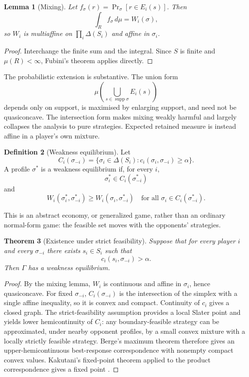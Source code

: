 \documentclass[11pt]{article}
\newtheorem{theorem}{Theorem}
\newtheorem{lemma}[theorem]{Lemma}
\theoremstyle{definition}
\newtheorem{definition}[theorem]{Definition}
\newcommand{\Prob}{\Pr}
\newcommand{\supp}{\operatorname{supp}}
\begin{document}
\begin{lemma}[Mixing]
Let $f_\sigma(r)=\Prob_\sigma[r\in E_i(s)]$. Then
\[
\int_R f_\sigma\,d\mu=W_i(\sigma),
\]
so $W_i$ is multiaffine on $\prod_i\Delta(S_i)$ and affine in $\sigma_i$.
\end{lemma}

\begin{proof}
Interchange the finite sum and the integral. Since $S$ is finite and $\mu(R)<\infty$, Fubini's theorem applies directly.
\end{proof}

The probabilistic extension is substantive. The union form
\[
\mu\!\left(\bigcup_{s\in\supp\sigma}E_i(s)\right)
\]
depends only on support, is maximised by enlarging support, and need not be quasiconcave. The intersection form makes mixing weakly harmful and largely collapses the analysis to pure strategies. Expected retained measure is instead affine in a player's own mixture.

\begin{definition}[Weakness equilibrium]
Let
\[
C_i(\sigma_{-i})=\{\sigma_i\in\Delta(S_i):c_i(\sigma_i,\sigma_{-i})\ge\alpha\}.
\]
A profile $\sigma^*$ is a weakness equilibrium if, for every $i$,
\[
\sigma_i^*\in C_i(\sigma_{-i}^*)
\]
and
\[
W_i(\sigma_i^*,\sigma_{-i}^*)\ge W_i(\sigma_i,\sigma_{-i}^*)
\quad\text{for all }\sigma_i\in C_i(\sigma_{-i}^*).
\]
\end{definition}

This is an abstract economy, or generalized game, rather than an ordinary normal-form game: the feasible set moves with the opponents' strategies.

\begin{theorem}[Existence under strict feasibility]\label{thm:existence}
Suppose that for every player $i$ and every $\sigma_{-i}$ there exists $s_i\in S_i$ such that
\[
c_i(s_i,\sigma_{-i})>\alpha.
\]
Then $\Gamma$ has a weakness equilibrium.
\end{theorem}

\begin{proof}
By the mixing lemma, $W_i$ is continuous and affine in $\sigma_i$, hence quasiconcave. For fixed $\sigma_{-i}$, $C_i(\sigma_{-i})$ is the intersection of the simplex with a single affine inequality, so it is convex and compact. Continuity of $c_i$ gives a closed graph. The strict-feasibility assumption provides a local Slater point and yields lower hemicontinuity of $C_i$: any boundary-feasible strategy can be approximated, under nearby opponent profiles, by a small convex mixture with a locally strictly feasible strategy. Berge's maximum theorem therefore gives an upper-hemicontinuous best-response correspondence with nonempty compact convex values. Kakutani's fixed-point theorem applied to the product correspondence gives a fixed point \cite{debreu,berge,kakutani}.
\end{proof}
\end{document}
